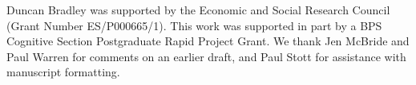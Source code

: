 \documentclass[journal]{vgtc}                %
\begin{document}
Duncan Bradley was supported by the Economic and Social Research Council
(Grant Number ES/P000665/1). This work was supported in part by a BPS
Cognitive Section Postgraduate Rapid Project Grant. We thank Jen McBride
and Paul Warren for comments on an earlier draft, and Paul Stott for
assistance with manuscript formatting.

\setlength{\bibsep}{0.0pt}

%

%
%
%
%

{\fontsize{8pt}{9.6pt}\selectfont }
\end{document}
